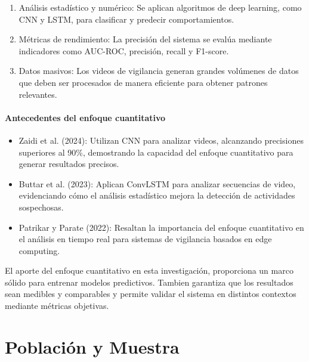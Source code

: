 \documentclass[listof=nochaptergap,12pt,times,authoryear]{report}
\begin{document}
\begin{enumerate}
    \item Análisis estadístico y numérico: Se aplican algoritmos de deep learning, como CNN y LSTM, para clasificar y predecir comportamientos.
    \item Métricas de rendimiento: La precisión del sistema se evalúa mediante indicadores como AUC-ROC, precisión, recall y F1-score.
    \item Datos masivos: Los videos de vigilancia generan grandes volúmenes de datos que deben ser procesados de manera eficiente para obtener patrones relevantes.
\end{enumerate}

\subsubsection{Antecedentes del enfoque cuantitativo}
\begin{itemize}
    \item Zaidi et al. (2024): Utilizan CNN para analizar videos, alcanzando precisiones superiores al 90\%, demostrando la capacidad del enfoque cuantitativo para generar resultados precisos.
    \item Buttar et al. (2023): Aplican ConvLSTM para analizar secuencias de video, evidenciando cómo el análisis estadístico mejora la detección de actividades sospechosas.
    \item Patrikar y Parate (2022): Resaltan la importancia del enfoque cuantitativo en el análisis en tiempo real para sistemas de vigilancia basados en edge computing.
\end{itemize}

El aporte del enfoque cuantitativo en esta investigación, proporciona un marco sólido para entrenar modelos predictivos. Tambien garantiza que los resultados sean medibles y comparables y permite validar el sistema en distintos contextos mediante métricas objetivas.


\chapter{Población y Muestra}
\end{document}
